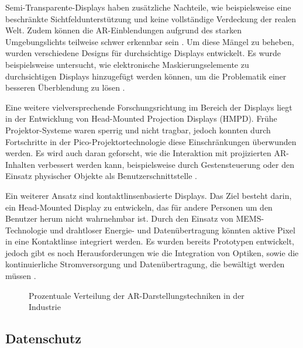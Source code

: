 Semi-Transparente-Displays haben zusätzliche Nachteile, wie beispielsweise eine
beschränkte Sichtfeldunterstützung und keine vollständige Verdeckung der realen
Welt. Zudem können die AR-Einblendungen aufgrund des starken Umgebungslichts
teilweise schwer erkennbar sein \cite{itoh2021towards}. Um diese Mängel zu
beheben, wurden verschiedene Designs für durchsichtige Displays entwickelt. Es
wurde beispielsweise untersucht, wie elektronische Maskierungselemente zu
durchsichtigen Displays hinzugefügt werden können, um die Problematik einer
besseren Überblendung zu lösen \cite{8676153}.

Eine weitere vielversprechende Forschungsrichtung im Bereich der Displays liegt
in der Entwicklung von Head-Mounted Projection Displays (HMPD). Frühe
Projektor-Systeme waren sperrig und nicht tragbar, jedoch konnten durch
Fortschritte in der Pico-Projektortechnologie diese Einschränkungen überwunden
werden. Es wird auch daran geforscht, wie die Interaktion mit projizierten
AR-Inhalten verbessert werden kann, beispielsweise durch Gestensteuerung oder
den Einsatz physischer Objekte als Benutzerschnittstelle
\cite{hartmann2020aar}.

Ein weiterer Ansatz sind kontaktlinsenbasierte Displays. Das Ziel besteht
darin, ein Head-Mounted Display zu entwickeln, das für andere Personen um den
Benutzer herum nicht wahrnehmbar ist. Durch den Einsatz von MEMS-Technologie
und drahtloser Energie- und Datenübertragung könnten aktive Pixel in eine
Kontaktlinse integriert werden. Es wurden bereits Prototypen entwickelt, jedoch
gibt es noch Herausforderungen wie die Integration von Optiken, sowie die
kontinuierliche Stromversorgung und Datenübertragung, die bewältigt werden
müssen \cite{chen2019design}.

\begin{figure}[h]
    \centering
    
    \caption[width=0.9\columnwidth]{Prozentuale Verteilung der AR-Darstellungstechniken in der Industrie \cite{de2018augmented} }
    \label{fig:PercDistributionARDisplay}
\end{figure}

\subsection{Datenschutz}

